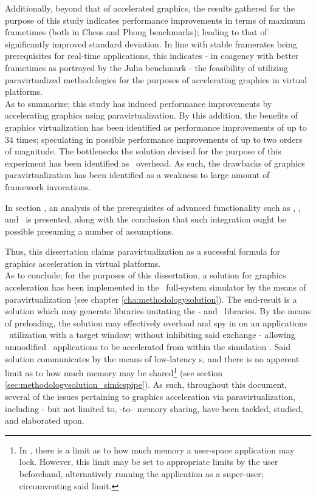 Additionally, beyond that of accelerated graphics, the results gathered for the purpose of this study indicates performance improvements in terms of maximum frametimes (both in Chess and Phong benchmarks); leading to that of significantly improved standard deviation.
In line with stable framerates being prerequisites for real-time applications, this indicates - in coagency with better frametimes as portrayed by the Julia benchmark - the feasibility of utilizing paravirtualized methodologies for the purposes of accelerating graphics in virtual platforms.\\

\noindent
As to summarize; this study has induced performance improvements by accelerating graphics using paravirtualization.
By this addition, the benefits of graphics virtualization has been identified as performance improvements of up to $34$ times; speculating in possible performance improvements of up to two orders of magnitude.
The bottlenecks the solution devised for the purpose of this experiment has been identified as \dvttermmagicinstruction\ overhead.
As such, the drawbacks of graphics paravirtualization has been identified as a weakness to large amount of framework invocations.

In section , an analysis of the prerequisites of advanced functionality such as \dvttermdeterministicexecution , \dvttermcheckpointing, and \dvttermreverseexecution\ is presented, along with the conclusion that such integration ought be possible presuming a number of assumptions.

Thus, this dissertation claims paravirtualization as a sucessful formula for graphics acceleration in virtual platforms.\\

\noindent
As to conclude; for the purposes of this dissertation, a solution for graphics acceleration has been implemented in the \dvttermsimics\ full-system simulator by the means of paravirtualization (see chapter \ref{cha:methodologysolution}).
The end-result is a solution which may generate libraries imitating the \dvttermegl - and \dvttermopenglestwopointo\ libraries.
By the means of preloading, the solution may effectively overload and spy in on an applications \dvttermegl\ utilization with a target window; without inhibiting said exchange - allowing unmodified \dvttermopengl\ applications to be accelerated from within the simulation \dvttermtarget .
Said solution communicates by the means of low-latency \dvttermmagicinstruction s, and there is no apperent limit as to how much memory may be shared\footnote{In \dvttermlinux , there is a limit as to how much memory a user-space application may lock. However, this limit may be set to appropriate limits by the user beforehand, alternatively running the application as a super-user; circumventing said limit.} (see section \ref{sec:methodologysolution_simicspipe}).
As such, throughout this document, several of the issues pertaining to graphics acceleration via paravirtualization, including - but not limited to, \dvttermtarget -to-\dvttermhost\ memory sharing, have been tackled, studied, and elaborated upon.


